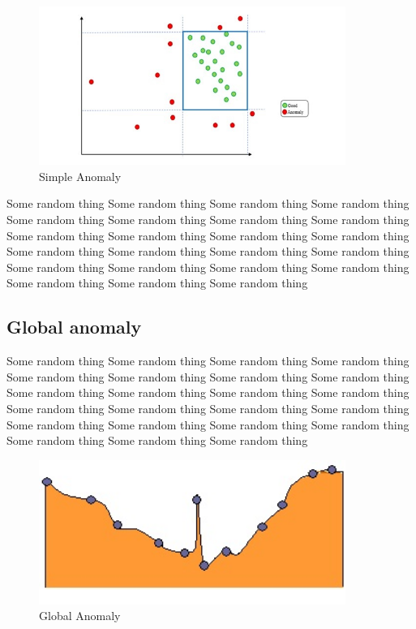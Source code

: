 \begin{figure}[h]
	\centering
	\includegraphics[width=10cm]{texfiles/images/image1.jpg}
	\caption{Simple Anomaly \protect\cite{Alla2019BeginningAD}}
	\label{fig:Figure 1}
\end{figure}
Some random thing Some random thing Some random thing Some random thing Some random thing Some random thing Some random thing Some random thing Some random thing Some random thing Some random thing Some random thing Some random thing Some random thing Some random thing Some random thing Some random thing Some random thing Some random thing Some random thing Some random thing Some random thing Some random thing  \cite{Sari2015}  

\subsection{Global anomaly}

Some random thing Some random thing Some random thing Some random thing Some random thing Some random thing Some random thing Some random thing Some random thing Some random thing Some random thing Some random thing Some random thing Some random thing Some random thing Some random thing Some random thing Some random thing Some random thing Some random thing Some random thing Some random thing Some random thing  
\begin{figure}
	\centering
	\includegraphics[width=10cm]{texfiles/images/global outlier.jpg}
	\caption{Global Anomaly \protect \cite{sayakpaul2019} }
	\label{fig:my_label}
\end{figure}

